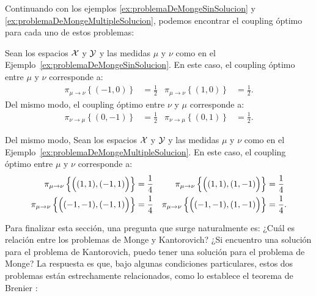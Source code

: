 Continuando con los ejemplos \ref*{ex:problemaDeMongeSinSolucion} y \ref*{ex:problemaDeMongeMultipleSolucion}, podemos encontrar el coupling óptimo para cada uno de estos problemas:

\begin{example}
    Sean los espacios $\mathcal{X}$ y $\mathcal{Y}$ y las medidas $\mu$ y $\nu$ como en el Ejemplo~\ref*{ex:problemaDeMongeSinSolucion}. En este caso, el coupling óptimo entre $\mu$ y $\nu$ corresponde a:
    \begin{align*}
        \pi_{\mu \to \nu}\left\{ (-1, 0) \right\} & = \frac{1}{2} & \pi_{\mu \to \nu}\left\{ (1, 0) \right\} & = \frac{1}{2}.
    \end{align*}
    Del mismo modo, el coupling óptimo entre $\nu$ y $\mu$ corresponde a:
    \begin{align*}
        \pi_{\nu \to \mu}\left\{ (0, -1) \right\} & = \frac{1}{2} & \pi_{\nu \to \mu}\left\{ (0, 1) \right\} & = \frac{1}{2}.
    \end{align*}

\end{example}

\begin{example}
    Del mismo modo, Sean los espacios $\mathcal{X}$ y $\mathcal{Y}$ y las medidas $\mu$ y $\nu$ como en el Ejemplo~\ref*{ex:problemaDeMongeMultipleSolucion}. En este caso, el coupling óptimo entre $\mu$ y $\nu$ corresponde a:
    \begin{align*}
        \pi_{\mu \to \nu}\left\{ \qty\Big((1, 1), (-1, 1)) \right\}   & = \frac{1}{4} & \pi_{\mu \to \nu}\left\{ \qty\Big((1, 1), (1, -1)) \right\}   & = \frac{1}{4}  \\
        \pi_{\mu \to \nu}\left\{ \qty\Big((-1, -1), (-1, 1)) \right\} & = \frac{1}{4} & \pi_{\mu \to \nu}\left\{ \qty\Big((-1, -1), (1, -1)) \right\} & = \frac{1}{4}.
    \end{align*}

\end{example}

Para finalizar esta sección, una pregunta que surge naturalmente es: ¿Cuál es relación entre los problemas de Monge y Kantorovich? ¿Si encuentro una solución para el problema de Kantorovich, puedo tener una solución para el problema de Monge? La respuesta es que, bajo algunas condiciones particulares, estos dos problemas están estrechamente relacionados, como lo establece el teorema de Brenier \cite{brenier1991polar}:

